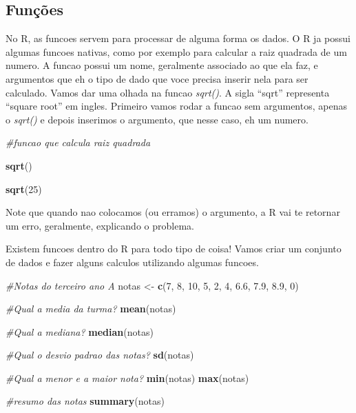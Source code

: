 \documentclass[
]{book}
\newenvironment{Shaded}{\begin{snugshade}}{\end{snugshade}}
\newcommand{\CommentTok}[1]{\textcolor[rgb]{0.56,0.35,0.01}{\textit{#1}}}
\newcommand{\DecValTok}[1]{\textcolor[rgb]{0.00,0.00,0.81}{#1}}
\newcommand{\FloatTok}[1]{\textcolor[rgb]{0.00,0.00,0.81}{#1}}
\newcommand{\FunctionTok}[1]{\textcolor[rgb]{0.13,0.29,0.53}{\textbf{#1}}}
\newcommand{\NormalTok}[1]{#1}
\newcommand{\OtherTok}[1]{\textcolor[rgb]{0.56,0.35,0.01}{#1}}
\begin{document}
\hypertarget{funuxe7uxf5es}{%
\subsection{Funções}\label{funuxe7uxf5es}}

No R, as funcoes servem para processar de alguma forma os dados. O R ja possui algumas funcoes nativas, como por exemplo para calcular a raiz quadrada de um numero. A funcao possui um nome, geralmente associado ao que ela faz, e argumentos que eh o tipo de dado que voce precisa inserir nela para ser calculado. Vamos dar uma olhada na funcao \emph{sqrt()}. A sigla ``sqrt'' representa ``square root'' em ingles. Primeiro vamos rodar a funcao sem argumentos, apenas o \emph{sqrt()} e depois inserimos o argumento, que nesse caso, eh um numero.

\begin{Shaded}
\begin{Highlighting}[]
\CommentTok{\#funcao que calcula raiz quadrada}

\FunctionTok{sqrt}\NormalTok{()}

\FunctionTok{sqrt}\NormalTok{(}\DecValTok{25}\NormalTok{)}
\end{Highlighting}
\end{Shaded}

Note que quando nao colocamos (ou erramos) o argumento, a R vai te retornar um erro, geralmente, explicando o problema.

Existem funcoes dentro do R para todo tipo de coisa! Vamos criar um conjunto de dados e fazer alguns calculos utilizando algumas funcoes.

\begin{Shaded}
\begin{Highlighting}[]
\CommentTok{\#Notas do terceiro ano A}
\NormalTok{notas }\OtherTok{\textless{}{-}} \FunctionTok{c}\NormalTok{(}\DecValTok{7}\NormalTok{, }\DecValTok{8}\NormalTok{, }\DecValTok{10}\NormalTok{, }\DecValTok{5}\NormalTok{, }\DecValTok{2}\NormalTok{, }\DecValTok{4}\NormalTok{, }\FloatTok{6.6}\NormalTok{, }\FloatTok{7.9}\NormalTok{, }\FloatTok{8.9}\NormalTok{, }\DecValTok{0}\NormalTok{)}

\CommentTok{\#Qual a media da turma?}
\FunctionTok{mean}\NormalTok{(notas)}

\CommentTok{\#Qual a mediana?}
\FunctionTok{median}\NormalTok{(notas)}

\CommentTok{\#Qual o desvio padrao das notas?}
\FunctionTok{sd}\NormalTok{(notas)}

\CommentTok{\#Qual a menor e a maior nota?}
\FunctionTok{min}\NormalTok{(notas)}
\FunctionTok{max}\NormalTok{(notas)}

\CommentTok{\#resumo das notas}
\FunctionTok{summary}\NormalTok{(notas)}
\end{Highlighting}
\end{Shaded}
\end{document}
